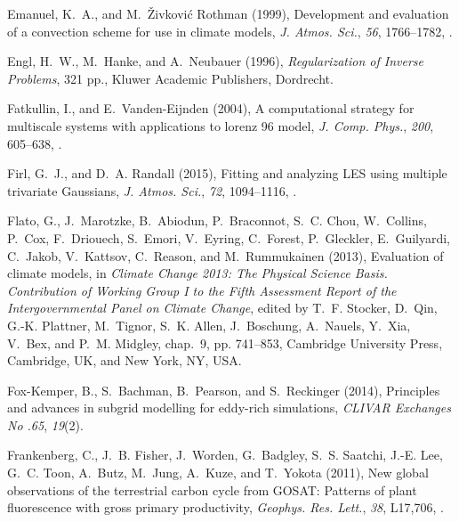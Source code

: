 \documentclass[draft]{agujournal}
\begin{document}
\begin{thebibliography}{196}
Emanuel, K.~A., and M.~\v{Z}ivkovi\'{c} Rothman (1999), Development and
  evaluation of a convection scheme for use in climate models, \textit{J.
  Atmos. Sci.}, \textit{56}, 1766--1782,
  .

Engl, H.~W., M.~Hanke, and A.~Neubauer (1996), \textit{Regularization of
  Inverse Problems}, 321 pp., Kluwer Academic Publishers, Dordrecht.

Fatkullin, I., and E.~Vanden-Eijnden (2004), A computational strategy for
  multiscale systems with applications to lorenz 96 model, \textit{J. Comp.
  Phys.}, \textit{200}, 605--638, .

Firl, G.~J., and D.~A. Randall (2015), Fitting and analyzing {LES} using
  multiple trivariate {G}aussians, \textit{J. Atmos. Sci.}, \textit{72},
  1094--1116, .

Flato, G., J.~Marotzke, B.~Abiodun, P.~Braconnot, S.~C. Chou, W.~Collins,
  P.~Cox, F.~Driouech, S.~Emori, V.~Eyring, C.~Forest, P.~Gleckler,
  E.~Guilyardi, C.~Jakob, V.~Kattsov, C.~Reason, and M.~Rummukainen (2013),
  Evaluation of climate models, in \textit{Climate Change 2013: The Physical
  Science Basis. Contribution of Working Group I to the Fifth Assessment Report
  of the Intergovernmental Panel on Climate Change}, edited by T.~F. Stocker,
  D.~Qin, G.-K. Plattner, M.~Tignor, S.~K. Allen, J.~Boschung, A.~Nauels,
  Y.~Xia, V.~Bex, and P.~M. Midgley, chap.~9, pp. 741--853, Cambridge
  University Press, Cambridge, UK, and New York, NY, USA.

Fox-Kemper, B., S.~Bachman, B.~Pearson, and S.~Reckinger (2014), Principles and
  advances in subgrid modelling for eddy-rich simulations, \textit{CLIVAR
  Exchanges No .65}, \textit{19}(2).

Frankenberg, C., J.~B. Fisher, J.~Worden, G.~Badgley, S.~S. Saatchi, J.-E. Lee,
  G.~C. Toon, A.~Butz, M.~Jung, A.~Kuze, and T.~Yokota (2011), New global
  observations of the terrestrial carbon cycle from {GOSAT}: Patterns of plant
  fluorescence with gross primary productivity, \textit{Geophys. Res. Lett.},
  \textit{38}, L17,706, .


\end{thebibliography}
\end{document}
